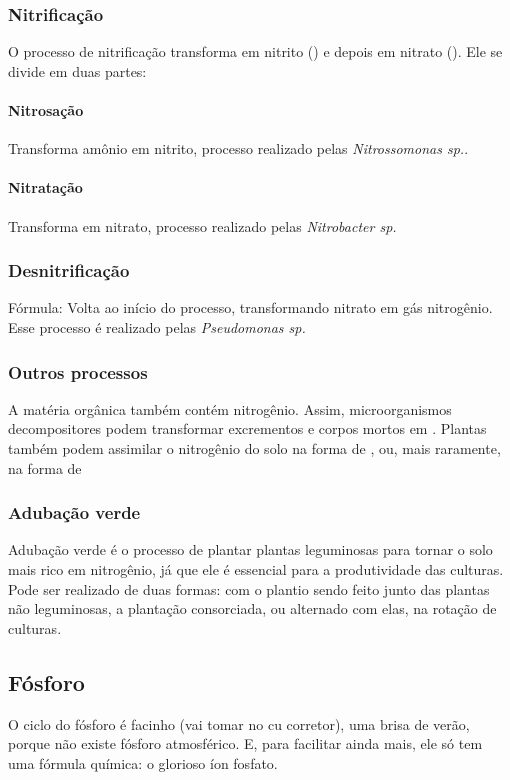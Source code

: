 \documentclass{article}
\begin{document}
\subsubsection{Nitrificação}
O processo de nitrificação transforma  em nitrito () e depois em nitrato (). Ele se divide em duas partes:
\paragraph{Nitrosação} 
Transforma amônio em nitrito, processo realizado pelas \textit{Nitrossomonas sp.}.
\paragraph{Nitratação} 
Transforma  em nitrato, processo realizado pelas \textit{Nitrobacter sp.}

\subsubsection{Desnitrificação} 
Fórmula: 
Volta ao início do processo, transformando nitrato em gás nitrogênio. Esse processo é realizado pelas \textit{Pseudomonas sp.}

\subsubsection{Outros processos}
A matéria orgânica também contém nitrogênio. Assim, microorganismos decompositores podem transformar excrementos e corpos mortos em . Plantas também podem assimilar o nitrogênio do solo na forma de , ou, mais raramente, na forma de 

\subsubsection{Adubação verde}
Adubação verde é o processo de plantar plantas leguminosas para tornar o solo mais rico em nitrogênio, já que ele é essencial para a produtividade das culturas. Pode ser realizado de duas formas: com o plantio sendo feito junto das plantas não leguminosas, a plantação consorciada, ou alternado com elas, na rotação de culturas.

\subsection{Fósforo}
O ciclo do fósforo é facinho (vai tomar no cu corretor), uma brisa de verão, porque não existe fósforo atmosférico. E, para facilitar ainda mais, ele só tem uma fórmula química:  o glorioso íon fosfato.
\end{document}
